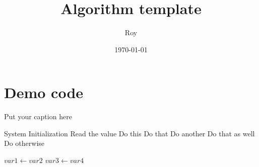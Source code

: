 \documentclass[a4paper]{article}
\title{Algorithm template}
\author{Roy}
\date{\today}    %
\begin{document}
\maketitle


\section{Demo code}

\begin{algorithm}
\caption{Put your caption here}

\begin{algorithmic}[1]

       
    \State System Initialization
    \State Read the value 
        \State Do this
        \State Do that
        \State Do another
        \State Do that as well
        \Else
        \State Do otherwise
        \EndIf
    \EndIf

      
        \State $var1 \leftarrow var2$  
        \State $var3 \leftarrow var4$
    \EndWhile  \label{roy's loop}
\EndProcedure

\end{algorithmic}
\end{algorithm}
\end{document}
